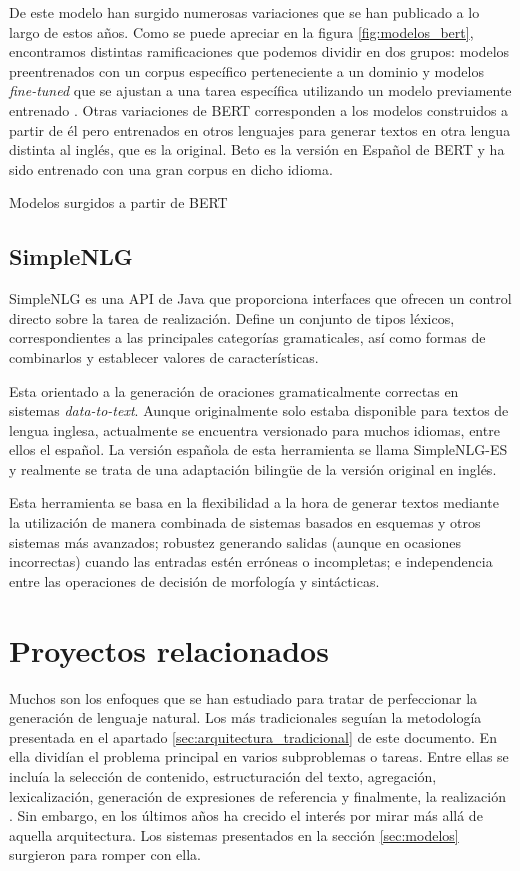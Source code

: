 De este modelo han surgido numerosas variaciones que se han publicado a lo largo de estos años. Como se puede apreciar en la figura \ref{fig:modelos_bert}, encontramos distintas ramificaciones que podemos dividir en dos grupos: modelos preentrenados con un corpus específico perteneciente a un dominio y modelos \textit{fine-tuned} que se ajustan a una tarea específica utilizando un modelo previamente entrenado \citep{rajasekharan_2019}.
Otras variaciones de BERT corresponden a los modelos construidos a partir de él pero entrenados en otros lenguajes para generar textos en otra lengua distinta al inglés, que es la original. Beto es la versión en Español de BERT \citep{CaneteCFP2020} y ha sido entrenado con una gran corpus en dicho idioma.

%
{Modelos surgidos a partir de BERT}


\subsection{SimpleNLG}
SimpleNLG es una API de Java que proporciona interfaces que ofrecen un control directo sobre la tarea de realización. Define un conjunto de tipos léxicos, correspondientes a las principales categorías gramaticales, así como formas de combinarlos y establecer valores de características. 

Esta orientado a la generación de oraciones gramaticalmente correctas en sistemas \textit{data-to-text}. Aunque originalmente solo estaba disponible para textos de lengua inglesa, actualmente se encuentra versionado para muchos idiomas, entre ellos el español. La versión española de esta herramienta se llama SimpleNLG-ES y realmente se trata de una adaptación bilingüe de la versión original en inglés.

Esta herramienta se basa en la flexibilidad a la hora de generar textos mediante la utilización de manera combinada de sistemas basados en esquemas y otros sistemas más avanzados; robustez generando salidas (aunque en ocasiones incorrectas) cuando las entradas estén erróneas o incompletas; e independencia entre las operaciones de decisión de morfología y sintácticas.

\section{Proyectos relacionados}
Muchos son los enfoques que se han estudiado para tratar de perfeccionar la generación de lenguaje natural. Los más tradicionales seguían la metodología presentada en el apartado \ref{sec:arquitectura_tradicional} de este documento. En ella dividían el problema principal en varios subproblemas o tareas. Entre ellas se incluía la selección de contenido, estructuración del texto, agregación, lexicalización, generación de expresiones de referencia y finalmente, la realización \citep{reiter1997building}. Sin embargo, en los últimos años ha crecido el interés por mirar más allá de aquella arquitectura. Los sistemas presentados en la sección \ref{sec:modelos} surgieron para romper con ella.

